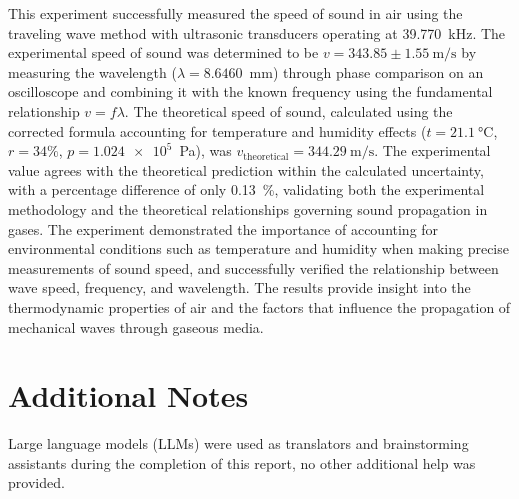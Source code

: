 \documentclass[12pt]{article}
\begin{document}
This experiment successfully measured the speed of sound in air using the traveling wave method with ultrasonic transducers operating at \SI{39.770}{\kilo\hertz}. The experimental speed of sound was determined to be $v = 343.85 \pm 1.55~\si{\meter\per\second}$ by measuring the wavelength ($\lambda = 8.6460$~\si{\milli\meter}) through phase comparison on an oscilloscope and combining it with the known frequency using the fundamental relationship $v = f\lambda$. The theoretical speed of sound, calculated using the corrected formula accounting for temperature and humidity effects ($t = \SI{21.1}{\celsius}$, $r = 34\%$, $p = \num{1.024e5}$~\si{\pascal}), was $v_{\text{theoretical}} = \SI{344.29}{\meter\per\second}$. The experimental value agrees with the theoretical prediction within the calculated uncertainty, with a percentage difference of only \SI{0.13}{\percent}, validating both the experimental methodology and the theoretical relationships governing sound propagation in gases. The experiment demonstrated the importance of accounting for environmental conditions such as temperature and humidity when making precise measurements of sound speed, and successfully verified the relationship between wave speed, frequency, and wavelength. The results provide insight into the thermodynamic properties of air and the factors that influence the propagation of mechanical waves through gaseous media.

\section*{Additional Notes}

Large language models (LLMs) were used as translators and brainstorming assistants during the completion of this report, no other additional help was provided.

\newpage

\end{document}
